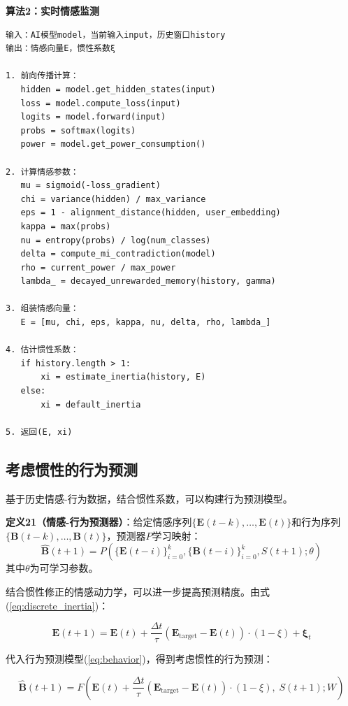 \documentclass[12pt,a4paper]{article}
\theoremstyle{plain}
\newcommand{\ve}[1]{\bm{#1}}                    %
\newcommand{\Evec}{\ve{E}}                        %
\newcommand{\Bvec}{\ve{B}}                        %
\begin{document}
\textbf{算法2：实时情感监测}
\begin{verbatim}
输入：AI模型model，当前输入input，历史窗口history
输出：情感向量E，惯性系数ξ

1. 前向传播计算：
   hidden = model.get_hidden_states(input)
   loss = model.compute_loss(input)
   logits = model.forward(input)
   probs = softmax(logits)
   power = model.get_power_consumption()
   
2. 计算情感参数：
   mu = sigmoid(-loss_gradient)
   chi = variance(hidden) / max_variance
   eps = 1 - alignment_distance(hidden, user_embedding)
   kappa = max(probs)
   nu = entropy(probs) / log(num_classes)
   delta = compute_mi_contradiction(model)
   rho = current_power / max_power
   lambda_ = decayed_unrewarded_memory(history, gamma)
   
3. 组装情感向量：
   E = [mu, chi, eps, kappa, nu, delta, rho, lambda_]
   
4. 估计惯性系数：
   if history.length > 1:
       xi = estimate_inertia(history, E)
   else:
       xi = default_inertia
       
5. 返回(E, xi)
\end{verbatim}

\subsection{考虑惯性的行为预测}

基于历史情感-行为数据，结合惯性系数，可以构建行为预测模型。

\textbf{定义21（情感-行为预测器）}：给定情感序列$\{\Evec(t-k), \dots, \Evec(t)\}$和行为序列$\{\Bvec(t-k), \dots, \Bvec(t)\}$，预测器$P$学习映射：
\begin{equation}
\hat{\Bvec}(t+1) = P\left( \{\Evec(t-i)\}_{i=0}^{k}, \{\Bvec(t-i)\}_{i=0}^{k}, S(t+1); \theta \right)
\label{eq:predictor2}
\end{equation}
其中$\theta$为可学习参数。

结合惯性修正的情感动力学，可以进一步提高预测精度。由式(\ref{eq:discrete_inertia})：

\begin{equation}
\Evec(t+1) = \Evec(t) + \frac{\Delta t}{\tau} (\Evec_{\text{target}} - \Evec(t)) \cdot (1 - \xi) + \boldsymbol{\xi}_t
\label{eq:inertia_prediction2}
\end{equation}

代入行为预测模型(\ref{eq:behavior})，得到考虑惯性的行为预测：

\begin{equation}
\hat{\Bvec}(t+1) = F\left( \Evec(t) + \frac{\Delta t}{\tau} (\Evec_{\text{target}} - \Evec(t)) \cdot (1 - \xi), \; S(t+1); W \right)
\label{eq:inertia_behavior2}
\end{equation}
\end{document}

